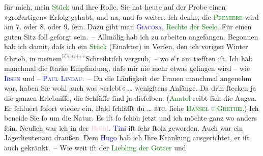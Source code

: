                für mich, mein \textcolor{green}{Stück}{} und ihre
               Rolle. {\pb}Sie hat heute auf der Probe einen
               »großartigen« Erfolg gehabt, und na, und ſo weiter. Ich denke, die \textsc{\textcolor{green}{Premiere}{}} wird am 7. oder 8. oder 9.{ }ſein. Dazu gibt man \textcolor{blue}{\textsc{Giacosa}}{}\ledrightnote{\textcolor{blue}{Giuseppe Giacosa}}, \textcolor{green}{Rechte der Seele}{}\ledrightnote{\textcolor{green}{Rechte der Seele}}. Für einen guten Sitz ſoll
               geſorgt sein. –\pend
           \pstart
           Allmälig hab ich zu arbeiten angefangen. Begonnen hab ich damit, daſs ich ein \textcolor{green}{Stück}{} (Einakter) in Verſen, {\pb}den ich vorigen Winter ſchrieb, in mein\introOben{}em\introOben{}{ }\substVorne{}\textsuperscript{\textcolor{gray}{Kästchen}}{\allowbreak}\substDazwischen{}Schreibtiſch\substHinten{} vergrub, – wo e\substVorne{}\textsuperscript{s}\substDazwischen{}r\substHinten{} am tiefſten iſt. Ich hab manchmal die ſtarke Empfindung, daſs mir nie mehr
               etwas gelingen wird – wie \textcolor{blue}{\textsc{Ibsen}}{}\ledrightnote{\textcolor{blue}{Henrik Ibsen}} und – \textcolor{blue}{\textsc{Paul Lindau}}{}\ledrightnote{\textcolor{blue}{Paul Lindau}}. –\pend
           \pstart
           Da die Läufigkeit der Frauen manchmal angenehm war, haben Sie wohl auch was »erlebt«
                  {\dots} wenigſtens {\pb}Anfänge.
               Da drin ſtecken ja die ganzen Erlebniſſe, die Schlüſſe ſind ja dieſelben. (\textcolor{green}{Anatol}{} reibt ſich die Augen. Er
                  ſchlu{\geminationm}ert ſofort wieder ein. Bald ſchläfſt du {\dots}{ }\textsc{etc}. ſiehe \textcolor{green}{\textsc{Hänsel u Grethel}}{}\ledrightnote{\textcolor{green}{Hänsel und Grethel}}) Ich beneide Sie ſo um die Natur. Es iſt ſo ſchön jetzt und ich möchte ganz wo
               anders ſein. Neulich war ich {\pb}in der \textcolor{pink}{Brühl}{}\ledrightnote{\textcolor{pink}{Brühl}}. \textcolor{blue}{Tini}{}\ledrightnote{\textcolor{blue}{Christine Schönberger}} iſt ſehr ſtolz
               geworden. Auch war ein Jägerlieutenant draußen. Dem \textcolor{blue}{Hugo}{}\ledrightnote{\textcolor{blue}{Hugo von Hofmannsthal}} hab ich Ihre Kränkung ausgerichtet, er iſt auch gekränkt. –\pend
           \pstart
           Wie weit iſt der \textcolor{green}{Liebling der Götter}{}\ledrightnote{\textcolor{green}{Der Tod Georgs}} und
